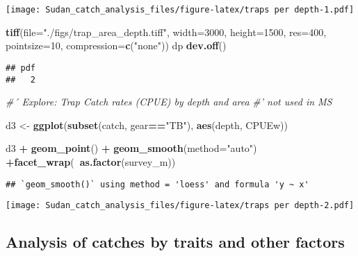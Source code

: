 \documentclass[]{article}
\newenvironment{Shaded}{\begin{snugshade}}{\end{snugshade}}
\newcommand{\KeywordTok}[1]{\textcolor[rgb]{0.13,0.29,0.53}{\textbf{#1}}}
\newcommand{\DataTypeTok}[1]{\textcolor[rgb]{0.13,0.29,0.53}{#1}}
\newcommand{\DecValTok}[1]{\textcolor[rgb]{0.00,0.00,0.81}{#1}}
\newcommand{\StringTok}[1]{\textcolor[rgb]{0.31,0.60,0.02}{#1}}
\newcommand{\CommentTok}[1]{\textcolor[rgb]{0.56,0.35,0.01}{\textit{#1}}}
\newcommand{\OperatorTok}[1]{\textcolor[rgb]{0.81,0.36,0.00}{\textbf{#1}}}
\newcommand{\NormalTok}[1]{#1}
\begin{document}
\texttt{[image: Sudan\_catch\_analysis\_files/figure-latex/traps per depth-1.pdf]}

\begin{Shaded}
\begin{Highlighting}[]
\KeywordTok{tiff}\NormalTok{(}\DataTypeTok{file=}\StringTok{"./figs/trap_area_depth.tiff"}\NormalTok{, }\DataTypeTok{width=}\DecValTok{3000}\NormalTok{, }\DataTypeTok{height=}\DecValTok{1500}\NormalTok{, }\DataTypeTok{res=}\DecValTok{400}\NormalTok{, }\DataTypeTok{pointsize=}\DecValTok{10}\NormalTok{, }\DataTypeTok{compression=}\KeywordTok{c}\NormalTok{(}\StringTok{"none"}\NormalTok{))}
\NormalTok{dp}
\KeywordTok{dev.off}\NormalTok{()}
\end{Highlighting}
\end{Shaded}

\begin{verbatim}
## pdf 
##   2
\end{verbatim}

\begin{Shaded}
\begin{Highlighting}[]
\CommentTok{#´ Explore: Trap Catch rates (CPUE) by depth and area}
\CommentTok{#' not used in MS}

\NormalTok{d3 <-}\StringTok{ }\KeywordTok{ggplot}\NormalTok{(}\KeywordTok{subset}\NormalTok{(catch, gear}\OperatorTok{==}\StringTok{"TB"}\NormalTok{), }\KeywordTok{aes}\NormalTok{(depth, CPUEw))}

\NormalTok{d3 }\OperatorTok{+}\StringTok{ }\KeywordTok{geom_point}\NormalTok{() }\OperatorTok{+}\StringTok{ }\KeywordTok{geom_smooth}\NormalTok{(}\DataTypeTok{method=}\StringTok{"auto"}\NormalTok{)  }\OperatorTok{+}\KeywordTok{facet_wrap}\NormalTok{(}\OperatorTok{~}\KeywordTok{as.factor}\NormalTok{(survey_m))}
\end{Highlighting}
\end{Shaded}

\begin{verbatim}
## `geom_smooth()` using method = 'loess' and formula 'y ~ x'
\end{verbatim}

\texttt{[image: Sudan\_catch\_analysis\_files/figure-latex/traps per depth-2.pdf]}

\subsection{Analysis of catches by traits and other
factors}\label{analysis-of-catches-by-traits-and-other-factors}
\end{document}
